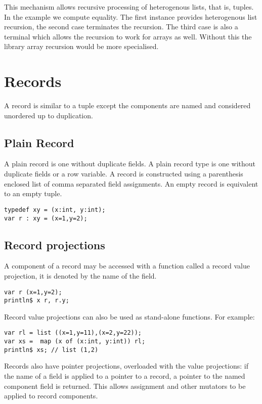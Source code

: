 \documentclass[oneside]{book}
\begin{document}
This mechanism allows recursive processing of heterogenous lists,
that is, tuples. In the example we compute equality.
The first instance provides heterogenous list recursion, 
the second case terminates the recursion. The third case
is also a terminal which allows the recursion to work
for arrays as well. Without this the library array recursion
would be more specialised.


\section{Records}
A record is similar to a tuple except the components are 
named and considered unordered up to duplication.

\subsection{Plain Record}
A plain record is one without duplicate fields. A plain record
type is one without duplicate fields or a row variable.
A record is constructed using a parenthesis enclosed list
of comma separated field assignments. An empty record is
equivalent to an empty tuple.

\begin{verbatim}
typedef xy = (x:int, y:int);
var r : xy = (x=1,y=2);
\end{verbatim}

\subsection{Record projections}
A component of a record may be accessed with a 
function called a record value projection, it is denoted
by the name of the field.

\begin{verbatim}
var r (x=1,y=2);
println$ x r, r.y;
\end{verbatim}

Record value projections can also be used as stand-alone
functions. For example:

\begin{verbatim}
var rl = list ((x=1,y=11),(x=2,y=22));
var xs =  map (x of (x:int, y:int)) rl;
println$ xs; // list (1,2)
\end{verbatim}

Records also have pointer projections, overloaded with
the value projections: if the name of
a field is applied to a pointer to a record,
a pointer to the named component field is returned.
This allows assignment and other mutators to be
applied to record components.
\end{document}
